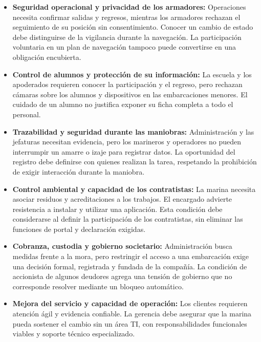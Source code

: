 \begin{itemize}
    \item \textbf{Seguridad operacional y privacidad de los armadores:}
    Operaciones necesita confirmar salidas y regresos, mientras los armadores rechazan el seguimiento de su posición sin consentimiento. Conocer un cambio de estado debe distinguirse de la vigilancia durante la navegación. La participación voluntaria en un plan de navegación tampoco puede convertirse en una obligación encubierta.

    \item \textbf{Control de alumnos y protección de su información:}
    La escuela y los apoderados requieren conocer la participación y el regreso, pero rechazan cámaras sobre los alumnos y dispositivos en las embarcaciones menores. El cuidado de un alumno no justifica exponer su ficha completa a todo el personal.

    \item \textbf{Trazabilidad y seguridad durante las maniobras:}
    Administración y las jefaturas necesitan evidencia, pero los marineros y operadores no pueden interrumpir un amarre o izaje para registrar datos. La oportunidad del registro debe definirse con quienes realizan la tarea, respetando la prohibición de exigir interacción durante la maniobra.

    \item \textbf{Control ambiental y capacidad de los contratistas:}
    La marina necesita asociar residuos y acreditaciones a los trabajos. El encargado advierte resistencia a instalar y utilizar una aplicación. Esta condición debe considerarse al definir la participación de los contratistas, sin eliminar las funciones de portal y declaración exigidas.

    \item \textbf{Cobranza, custodia y gobierno societario:}
    Administración busca medidas frente a la mora, pero restringir el acceso a una embarcación exige una decisión formal, registrada y fundada de la compañía. La condición de accionista de algunos deudores agrega una tensión de gobierno que no corresponde resolver mediante un bloqueo automático.

    \item \textbf{Mejora del servicio y capacidad de operación:}
    Los clientes requieren atención ágil y evidencia confiable. La gerencia debe asegurar que la marina pueda sostener el cambio sin un área TI, con responsabilidades funcionales viables y soporte técnico especializado.
\end{itemize}

